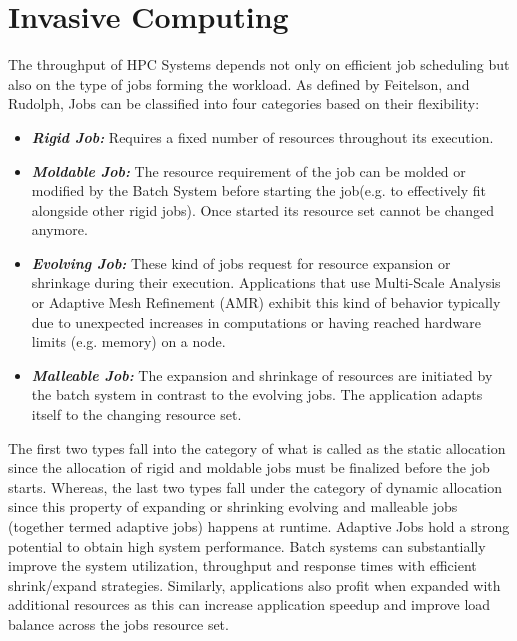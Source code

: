 \section{Invasive Computing}
The throughput of HPC Systems depends not only on efficient job scheduling but also on the type of jobs forming the workload. As defined by Feitelson, and Rudolph, Jobs can be classified into four categories based on their flexibility:
\begin{itemize}
\item \textbf{\textit{Rigid Job:}} Requires a fixed number of resources throughout its execution.
\item \textbf{\textit{Moldable Job: }} The resource requirement of the job can be molded or modified by the Batch System before starting the job(e.g. to effectively fit alongside other rigid jobs). Once started its resource set cannot be changed anymore.
\item \textbf{\textit{Evolving Job: }} These kind of jobs request for resource expansion or shrinkage during their execution. Applications that use Multi-Scale Analysis or Adaptive Mesh Refinement (AMR) exhibit this kind of behavior typically due to unexpected increases in computations or having reached hardware limits (e.g. memory) on a node.
\item \textbf{\textit{Malleable Job: }} The expansion and shrinkage of resources are initiated by the batch system in contrast to the evolving jobs. The application adapts itself to the changing resource set.
\end{itemize}
The first two types fall into the category of what is called as the static allocation since the allocation of rigid and moldable jobs must be finalized before the job starts. Whereas, the last two types fall under the category of dynamic allocation since this property of expanding or shrinking evolving and malleable jobs (together termed adaptive jobs) happens at runtime. Adaptive Jobs hold a strong potential to obtain high system performance. Batch systems can substantially improve the system utilization, throughput and response times with efficient shrink/expand strategies. Similarly, applications also profit when expanded with additional resources as this can increase application speedup and improve load balance across the job\textquotesingle s resource set.\\ \par
\noindent
